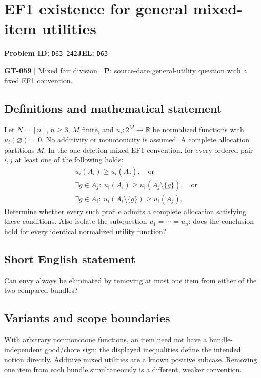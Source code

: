 \documentclass[11pt,a4paper]{article}
\begin{document}
\section*{EF1 existence for general mixed-item utilities}
\textbf{Problem ID:} \texttt{D63-242}\quad \textbf{JEL:} \texttt{D63}\par
\label{problem:OP-0189}
\label{game:GT-059}
{\sffamily\small\color{muted}
\textbf{GT-059} | Mixed fair division | \textbf{P}: source-date general-utility question with a fixed EF1 convention.
\par}
\subsection*{Definitions and mathematical statement}
Let $N=[n]$, $n\geq3$, $M$ finite, and $u_i:2^M\to\mathbb R$ be normalized functions with $u_i(\varnothing)=0$. No additivity or monotonicity is assumed. A complete allocation partitions $M$. In the one-deletion mixed EF1 convention, for every ordered pair $i,j$ at least one of the following holds:
\[
 \begin{split}
 &u_i(A_i)\geq u_i(A_j),\quad\text{or}\\
 &\exists g\in A_j:\ u_i(A_i)\geq u_i(A_j\setminus\{g\}),\quad\text{or}\\
 &\exists g\in A_i:\ u_i(A_i\setminus\{g\})\geq u_i(A_j).
 \end{split}
\]
Determine whether every such profile admits a complete allocation satisfying these conditions. Also isolate the subquestion $u_1=\cdots=u_n$: does the conclusion hold for every identical normalized utility function?
\subsection*{Short English statement}
Can envy always be eliminated by removing at most one item from either of the two compared bundles?
\subsection*{Variants and scope boundaries}
With arbitrary nonmonotone functions, an item need not have a bundle-independent good/chore sign; the displayed inequalities define the intended notion directly. Additive mixed utilities are a known positive subcase. Removing one item from each bundle simultaneously is a different, weaker convention.
\end{document}
